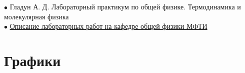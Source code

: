$\bullet$ Гладун А. Д. Лабораторный практикум по общей физике. Термодинамика и молекулярная физика\\

$\bullet$ \href{https://mipt.ru/education/chair/physics/S_II/lab/}{Описание лабораторных работ на кафедре общей физики МФТИ}

\newpage

\section{Графики}


\begin{figure}[h]
\end{figure}


